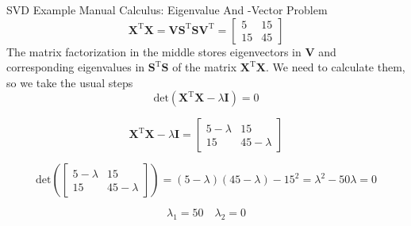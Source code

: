 \documentclass[mathserif, aspectratio=1610]{intbeamer}
\begin{document}
\begin{frame}[t]{SVD Example Manual Calculus: Eigenvalue And -Vector Problem}
$$\bm{X}^\mathrm{T} \bm{X} =
\bm{V}\bm{S}^\mathrm{T}\bm{S}\bm{V}^\mathrm{T} =
\begin{bmatrix}
5 & 15\\
15 & 45
\end{bmatrix}$$
The matrix factorization in the middle stores eigenvectors in $\bm{V}$ and
corresponding eigenvalues in $\bm{S}^\mathrm{T}\bm{S}$ of the matrix
$\bm{X}^\mathrm{T} \bm{X}$.
We need to calculate them, so we take the usual steps
$$\mathrm{det}(\bm{X}^\mathrm{T} \bm{X} - \lambda \bm{I}) = 0$$

$$\bm{X}^\mathrm{T} \bm{X} - \lambda \bm{I} =
\begin{bmatrix}
5-\lambda & 15\\
15 & 45-\lambda
\end{bmatrix}$$

$$\mathrm{det}(\begin{bmatrix}
5-\lambda & 15\\
15 & 45-\lambda
\end{bmatrix}) =
(5-\lambda)(45-\lambda) - 15^2 = \lambda^2-50\lambda = 0$$

$$\lambda_1 = 50\quad \lambda_2 = 0$$

\end{frame}
\end{document}
